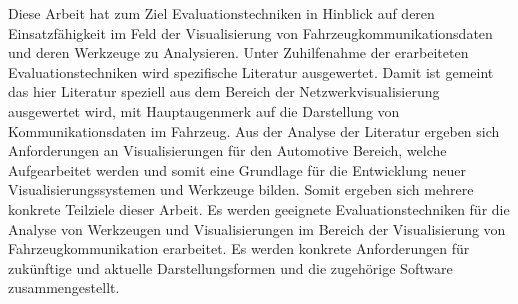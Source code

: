\documentclass[draft=false
              ,paper=a4
              ,twoside=false
              ,fontsize=11pt
              ,headsepline
              ,BCOR10mm
              ,DIV11
              ]{scrbook}
\newcommand{\TODO}[1]{\colorbox{yellow}{\textcolor{red}{[TODO: #1]}}}
\begin{document}
Diese Arbeit hat zum Ziel Evaluationstechniken in Hinblick auf deren Einsatzfähigkeit im Feld der Visualisierung von Fahrzeugkommunikationsdaten und deren Werkzeuge zu Analysieren. Unter Zuhilfenahme der erarbeiteten Evaluationstechniken wird spezifische Literatur ausgewertet. Damit ist gemeint das hier Literatur speziell aus dem Bereich der Netzwerkvisualisierung ausgewertet wird, mit Hauptaugenmerk auf die Darstellung von Kommunikationsdaten im Fahrzeug. Aus der Analyse der Literatur ergeben sich Anforderungen an Visualisierungen für den Automotive Bereich, welche Aufgearbeitet werden und somit eine Grundlage für die Entwicklung neuer Visualisierungssystemen und Werkzeuge bilden. 
Somit ergeben sich mehrere konkrete Teilziele dieser Arbeit. Es werden geeignete Evaluationstechniken für die Analyse von Werkzeugen und Visualisierungen im Bereich der Visualisierung von Fahrzeugkommunikation erarbeitet. Es werden konkrete Anforderungen für zukünftige und aktuelle Darstellungsformen und die zugehörige Software zusammengestellt.

\end{document}
